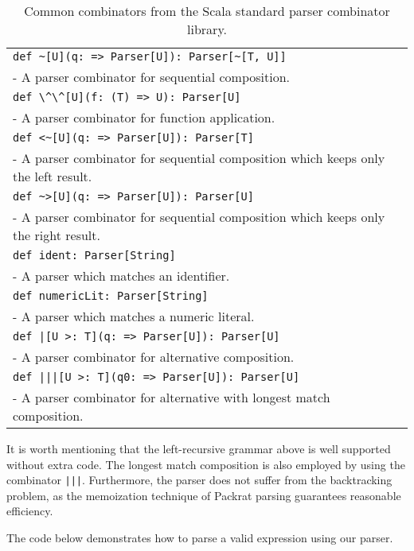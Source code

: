 \begin{table}
\begin{tabularx}{\linewidth}{X}
\hline
\lstinline{def ~[U](q: => Parser[U]): Parser[~[T, U]]} \\
- A parser combinator for sequential composition. \\ \hline
\lstinline{def \^\^[U](f: (T) => U): Parser[U]} \\
- A parser combinator for function application. \\ \hline
\lstinline{def <~[U](q: => Parser[U]): Parser[T]} \\
- A parser combinator for sequential composition which keeps only the left result. \\ \hline
\lstinline{def ~>[U](q: => Parser[U]): Parser[U]} \\
- A parser combinator for sequential composition which keeps only the right result. \\ \hline
\lstinline{def ident: Parser[String]} \\
- A parser which matches an identifier. \\ \hline
\lstinline{def numericLit: Parser[String]} \\
- A parser which matches a numeric literal. \\ \hline
\lstinline{def |[U >: T](q: => Parser[U]): Parser[U]} \\
- A parser combinator for alternative composition. \\ \hline
\lstinline{def |||[U >: T](q0: => Parser[U]): Parser[U]} \\
- A parser combinator for alternative with longest match composition. \\ \hline
\end{tabularx}
\caption{Common combinators from the Scala standard parser combinator library.}\label{tab:packrat}
\end{table}

It is worth mentioning that the left-recursive grammar above is well supported without extra code.
 The longest match composition is also employed by using the combinator \lstinline{|||}. Furthermore, the parser does not suffer from the backtracking problem, as the memoization technique of Packrat parsing guarantees reasonable efficiency.

The code below demonstrates how to parse a valid expression  using our parser.

